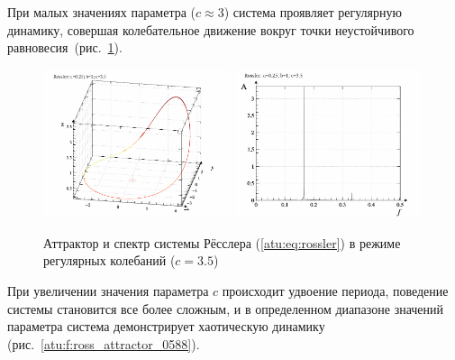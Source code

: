 При малых значениях параметра (\(c \approx 3 \))
система проявляет регулярную динамику,
совершая колебательное движение вокруг точки
неустойчивого равновесия~(рис.~\ref{atu:f:ross_attractor_0300}).

\begin{figure}[ht!]
\begin{center}
  \includegraphics[width=0.49\textwidth]{p/cha/ross/ross0-p_xyz_c=03x50.png}
  \hfill
  \includegraphics[width=0.49\textwidth]{p/cha/ross/ross_f-p_f_c=03x50.png}
\end{center}
  \caption{Аттрактор и спектр системы Рёсслера (\ref{atu:eq:rossler}) в режиме регулярных колебаний ($c=3.5$)}
\label{atu:f:ross_attractor_0300}
\end{figure}

При увеличении значения параметра \(c\) происходит удвоение периода,
поведение системы становится все более сложным, и в определенном
диапазоне значений параметра система демонстрирует
хаотическую динамику~\cite{atu_st67} (рис.~\ref{atu:f:ross_attractor_0588}).

